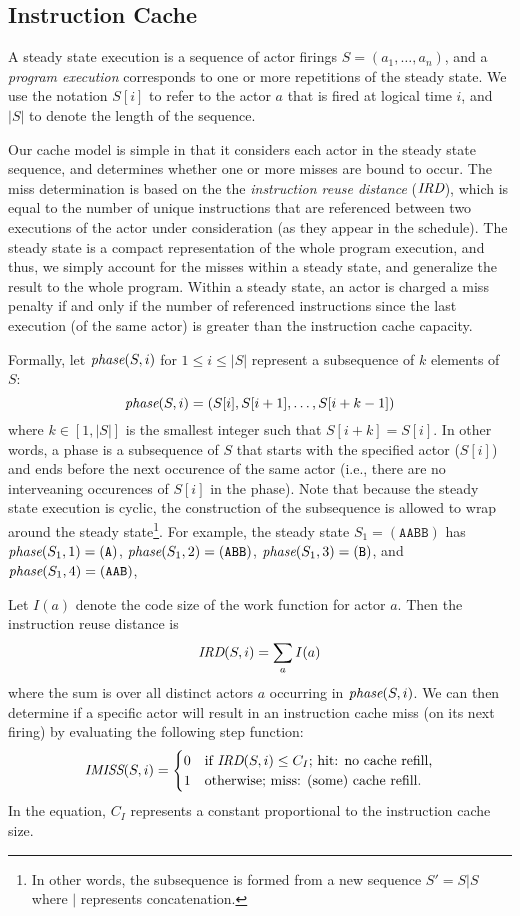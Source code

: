 \subsection{Instruction Cache}

A steady state execution is a sequence of actor firings
$S=(a_1,\ldots, a_n)$, and a
{\it program execution} corresponds to one or more repetitions of the
steady state. We use the notation $S[i]$ to refer to the
actor $a$ that is fired at logical time $i$, and $|S|$ to
denote the length of the sequence. 

Our cache model is simple in that it considers each actor in the
steady state sequence, and determines whether one or more misses are
bound to occur. The miss determination is based on the 
the {\it instruction reuse distance} ($\mbox{\it IRD}$), which is equal to
the number of unique instructions that are referenced between two
executions of the actor under consideration (as they appear in the
schedule). The steady state is a 
compact representation of the whole program execution, and thus, we
simply account for the misses within a steady state, and generalize
the result to the whole program. Within a steady state, an actor is
charged a miss penalty if and only if the number of referenced
instructions since the last execution (of the same actor)
is greater than the instruction cache capacity.

Formally, let $\mbox{\it phase}(S,i)$ for $1\le i\le|S|$ represent a
subsequence of $k$ elements of $S$:
\[ 
\mbox{\it phase}(S,i) = ( S[i], S[i+1], \ldots, S[i+k-1] )
\]
where $k\in[1,|S|]$ is the smallest integer such that $S[i+k]=S[i]$.
In other words, a phase is a subsequence of $S$ that starts with the
specified actor ($S[i]$) and ends before the next occurence of the same actor
(i.e., there are no interveaning occurences of $S[i]$ in the phase).
Note that because the steady state
execution is cyclic, the construction of the subsequence is allowed to
wrap around the steady state\footnote{In other words, the subsequence
is formed from a new sequence $S'=S|S$ where $|$ represents
concatenation.}. For example, the steady state $S_1=(\texttt{AABB})$
has 
$\mbox{\it phase}(S_1,1)=(\texttt{A})$,
$\mbox{\it phase}(S_1,2)=(\texttt{ABB})$,
$\mbox{\it phase}(S_1,3)=(\texttt{B})$, and
$\mbox{\it phase}(S_1,4)=(\texttt{AAB})$,


Let $I(a)$ denote the code size of the work function for actor $a$.
Then the instruction reuse distance is
\[
\mbox{\it IRD}(S,i)=\sum_{a} I(a)
\]
where the sum is over all distinct actors $a$ occurring in
$\mbox{\it phase}(S,i)$. We can then determine if a specific actor will
result in an instruction cache miss (on its next firing) by evaluating
the following step function:
\begin{equation}
\label{eq:imiss}
  \mbox{\it IMISS}(S,i) =
    \begin{cases}
      0& \text{if $\mbox{\it IRD}(S,i) \leq C_I$; hit: no cache refill,}\\
      1& \text{otherwise; miss: (some) cache refill.}
    \end{cases}
\end{equation}
In the equation, $C_I$ represents a constant proportional to the
instruction cache size. 

